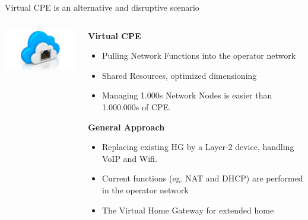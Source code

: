 \documentclass[a4paper]{beamer}
\begin{document}
\begin{frame}{Virtual CPE is an alternative and disruptive scenario}
						
	\begin{columns}[T]
		\begin{column}[T]{0.33 \textwidth} 
			\vspace{2.2cm}
			\includegraphics[width=12em]{vhg.png}
		\end{column}
										
		\begin{column}[T]{0.66\textwidth} 
										   
			\textbf{ Virtual CPE}
			\begin{itemize}
				\item Pulling Network Functions into the operator network
				\item Shared Resources, optimized dimensioning
				\item Managing 1.000s Network Nodes is easier than 1.000.000s of CPE.
			\end{itemize}
			\vspace{3mm}
			\textbf{General Approach}
			\begin{itemize}
				\item Replacing existing HG by a Layer-2 device, handling VoIP and Wifi.
				\item Current functions (eg. NAT and DHCP) are performed in the operator network
				\item The Virtual Home Gateway for extended home
			\end{itemize}
										
																																						
		\end{column}
																										
	\end{columns}
										
\end{frame}
\end{document}
